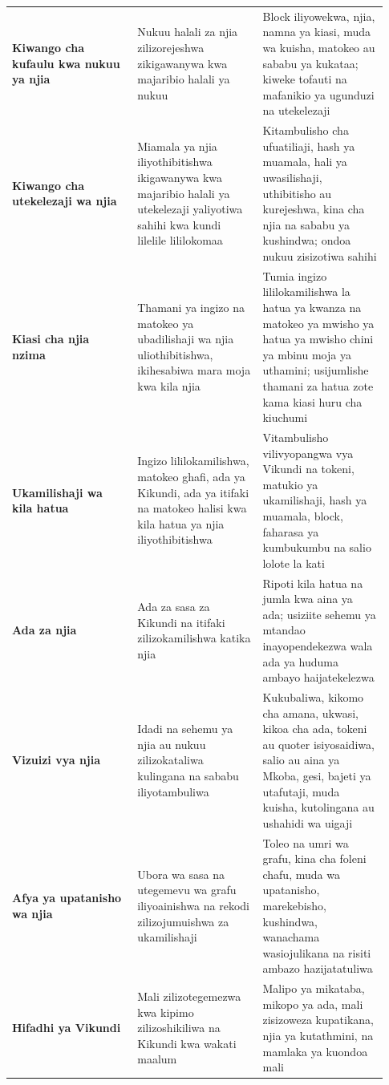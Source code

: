 \documentclass[11pt]{article}
\begin{document}
\begin{longtable}{P{0.31\linewidth} P{0.31\linewidth} P{0.31\linewidth}}
\textbf{Kiwango cha kufaulu kwa nukuu ya njia} & Nukuu halali za njia zilizorejeshwa zikigawanywa kwa majaribio halali ya nukuu & Block iliyowekwa, njia, namna ya kiasi, muda wa kuisha, matokeo au sababu ya kukataa; kiweke tofauti na mafanikio ya ugunduzi na utekelezaji \\
\textbf{Kiwango cha utekelezaji wa njia} & Miamala ya njia iliyothibitishwa ikigawanywa kwa majaribio halali ya utekelezaji yaliyotiwa sahihi kwa kundi lilelile lililokomaa & Kitambulisho cha ufuatiliaji, hash ya muamala, hali ya uwasilishaji, uthibitisho au kurejeshwa, kina cha njia na sababu ya kushindwa; ondoa nukuu zisizotiwa sahihi \\
\textbf{Kiasi cha njia nzima} & Thamani ya ingizo na matokeo ya ubadilishaji wa njia uliothibitishwa, ikihesabiwa mara moja kwa kila njia & Tumia ingizo lililokamilishwa la hatua ya kwanza na matokeo ya mwisho ya hatua ya mwisho chini ya mbinu moja ya uthamini; usijumlishe thamani za hatua zote kama kiasi huru cha kiuchumi \\
\textbf{Ukamilishaji wa kila hatua} & Ingizo lililokamilishwa, matokeo ghafi, ada ya Kikundi, ada ya itifaki na matokeo halisi kwa kila hatua ya njia iliyothibitishwa & Vitambulisho vilivyopangwa vya Vikundi na tokeni, matukio ya ukamilishaji, hash ya muamala, block, faharasa ya kumbukumbu na salio lolote la kati \\
\textbf{Ada za njia} & Ada za sasa za Kikundi na itifaki zilizokamilishwa katika njia & Ripoti kila hatua na jumla kwa aina ya ada; usiziite sehemu ya mtandao inayopendekezwa wala ada ya huduma ambayo haijatekelezwa \\
\textbf{Vizuizi vya njia} & Idadi na sehemu ya njia au nukuu zilizokataliwa kulingana na sababu iliyotambuliwa & Kukubaliwa, kikomo cha amana, ukwasi, kikoa cha ada, tokeni au quoter isiyosaidiwa, salio au aina ya Mkoba, gesi, bajeti ya utafutaji, muda kuisha, kutolingana au ushahidi wa uigaji \\
\textbf{Afya ya upatanisho wa njia} & Ubora wa sasa na utegemevu wa grafu iliyoainishwa na rekodi zilizojumuishwa za ukamilishaji & Toleo na umri wa grafu, kina cha foleni chafu, muda wa upatanisho, marekebisho, kushindwa, wanachama wasiojulikana na risiti ambazo hazijatatuliwa \\
\textbf{Hifadhi ya Vikundi} & Mali zilizotegemezwa kwa kipimo zilizoshikiliwa na Kikundi kwa wakati maalum & Malipo ya mikataba, mikopo ya ada, mali zisizoweza kupatikana, njia ya kutathmini, na mamlaka ya kuondoa mali \\

\end{longtable}
\end{document}
